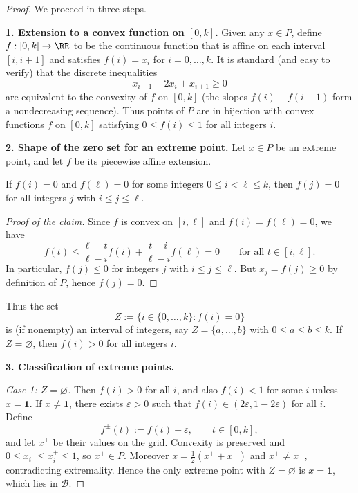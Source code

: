 \begin{proof}
    We proceed in three steps.

    \smallskip
    \noindent\textbf{1. Extension to a convex function on $[0,k]$.}
    Given any $x\in P$, define $f:[0,k]\to\RR$ to be the continuous function that is affine on each interval $[i,i+1]$ and satisfies $f(i)=x_i$ for $i=0,\dots,k$.
    It is standard (and easy to verify) that the discrete inequalities
    \[
        x_{i-1}-2x_i+x_{i+1}\ge0
    \]
    are equivalent to the convexity of $f$ on $[0,k]$ (the slopes $f(i)-f(i-1)$ form a nondecreasing sequence).
    Thus points of $P$ are in bijection with convex functions $f$ on $[0,k]$ satisfying $0\le f(i)\le1$ for all integers $i$.

    \smallskip
    \noindent\textbf{2. Shape of the zero set for an extreme point.}
    Let $x\in P$ be an extreme point, and let $f$ be its piecewise affine extension.

    \begin{claim}
        If $f(i)=0$ and $f(\ell)=0$ for some integers $0\le i<\ell\le k$, then $f(j)=0$ for all integers $j$ with $i\le j\le \ell$.
    \end{claim}

    \begin{proof}[Proof of the claim]
        Since $f$ is convex on $[i,\ell]$ and $f(i)=f(\ell)=0$, we have
        \[
            f(t)\le \frac{\ell-t}{\ell-i}f(i)+\frac{t-i}{\ell-i}f(\ell)=0
            \qquad\text{for all }t\in[i,\ell].
        \]
        In particular, $f(j)\le0$ for integers $j$ with $i\le j\le \ell$.
        But $x_j=f(j)\ge0$ by definition of $P$, hence $f(j)=0$.
    \end{proof}

    Thus the set
    \[
        Z:=\{i\in\{0,\dots,k\}: f(i)=0\}
    \]
    is (if nonempty) an interval of integers, say $Z=\{a,\dots,b\}$ with $0\le a\le b\le k$.
    If $Z=\varnothing$, then $f(i)>0$ for all integers $i$.

    \smallskip
    \noindent\textbf{3. Classification of extreme points.}

    \smallskip
    \emph{Case 1: $Z=\varnothing$.}
    Then $f(i)>0$ for all $i$, and also $f(i)<1$ for some $i$ unless $x=\mathbf{1}$.
    If $x\neq\mathbf{1}$, there exists $\varepsilon>0$ such that $f(i)\in(2\varepsilon,1-2\varepsilon)$ for all $i$.
    Define
    \[
        f^{\pm}(t):=f(t)\pm\varepsilon,\qquad t\in[0,k],
    \]
    and let $x^{\pm}$ be their values on the grid.
    Convexity is preserved and $0\le x_i^{-}\le x_i^{+}\le1$, so $x^{\pm}\in P$.
    Moreover $x=\frac12(x^{+}+x^{-})$ and $x^{+}\neq x^{-}$, contradicting extremality.
    Hence the only extreme point with $Z=\varnothing$ is $x=\mathbf{1}$, which lies in $\mathcal{B}$.


\end{proof}
